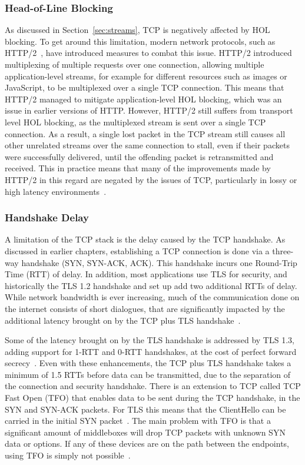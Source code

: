 \documentclass[english, 12pt, a4paper, elec, utf8, a-2b, online]{aaltothesis}
\begin{document}
\subsubsection{Head-of-Line Blocking}
\label{sec:hol}
As discussed in Section~\ref{sec:streams}, TCP is negatively affected by HOL blocking.
To get around this limitation, modern
network protocols, such as HTTP/2~\cite{rfc9113}, have introduced measures to
combat this issue. HTTP/2 introduced multiplexing of multiple requests over one
connection, allowing multiple application-level streams, for example for different
resources such as images or JavaScript, to be multiplexed over a single TCP
connection. This means that HTTP/2 managed to mitigate application-level HOL
blocking, which was an issue in earlier versions of HTTP. However, HTTP/2 still
suffers from transport level HOL blocking, as the multiplexed stream is
sent over a single TCP connection. As a result, a single lost packet in the TCP
stream still causes all other unrelated streams over the same connection to stall,
even if their packets were successfully delivered, until the offending packet
is retransmitted and received. This in practice means that many of the improvements made
by HTTP/2 in this regard are negated by the issues of TCP, particularly in lossy or high latency
environments~\cite{http2_vs_1}.

\subsubsection{Handshake Delay}
A limitation of the TCP stack is the delay caused by the TCP handshake. As discussed
in earlier chapters, establishing a TCP connection is done via a three-way handshake
(SYN, SYN-ACK, ACK). This handshake incurs one Round-Trip Time (RTT) of delay. In
addition, most applications use TLS for security, and historically the TLS 1.2 handshake
and set up add two additional RTTs of delay. While network bandwidth is ever increasing,
much of the communication done on the internet consists of short dialogues, that
are significantly impacted by the additional latency brought on by the TCP plus TLS
handshake~\cite{quic_transport_protocol_design}.

Some of the latency brought on by the TLS handshake is addressed by TLS 1.3, adding
support for 1-RTT and 0-RTT handshakes, at the cost of perfect forward secrecy~\cite{rfc8446}. Even with
these enhancements, the TCP plus TLS handshake takes a minimum of 1.5 RTTs before data can be
transmitted, due to the separation of the connection and security handshake. There is
an extension to TCP called TCP Fast Open (TFO) that enables data to be sent during
the TCP handshake, in the SYN and SYN-ACK packets. For TLS this means that
the ClientHello can be carried in the initial SYN packet~\cite{rfc7413}. The main problem
with TFO is that a significant amount of middleboxes will drop TCP packets with
unknown SYN data or options. If any of these devices are on the path between the
endpoints, using TFO is simply not possible~\cite{fast_open_problem}.
\end{document}
